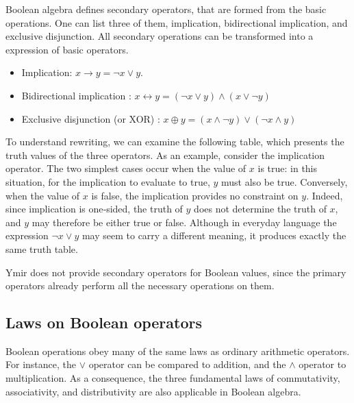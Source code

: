 Boolean algebra defines secondary operators, that are formed from the basic
operations. One can list three of them, implication, bidirectional implication,
and exclusive disjunction. All secondary operations can be transformed into a
expression of basic operators.

\begin{itemize}
\vspace{-5pt}%
\item Implication: $x \rightarrow y = \lnot x \lor y$.
\vspace{-5pt}%
\item Bidirectional implication : $x \leftrightarrow y = (\lnot x \lor y) \land (x \lor \lnot y)$ 
\vspace{-5pt}
\item Exclusive disjunction (or XOR) : $x \oplus y = (x \land \lnot y) \lor (\lnot x \land y)$
\end{itemize}
\vspace{-5pt}%




To understand rewriting, we can examine the following table, which presents the
truth values of the three operators. As an example, consider the implication
operator. The two simplest cases occur when the value of $x$ is true: in this
situation, for the implication to evaluate to true, $y$ must also be true.
Conversely, when the value of $x$ is false, the implication provides no
constraint on $y$. Indeed, since implication is one‑sided, the truth of $y$ does
not determine the truth of $x$, and $y$ may therefore be either true or false.
Although in everyday language the expression $\lnot x \lor y$ may seem to carry
a different meaning, it produces exactly the same truth table.

Ymir does not provide secondary operators for Boolean values, since the primary
operators already perform all the necessary operations on them.

\subsection{Laws on Boolean operators}

Boolean operations obey many of the same laws as ordinary arithmetic operators.
 For instance, the $\lor$ operator can be compared to addition, and the $\land$
 operator to multiplication. As a consequence, the three fundamental laws of
 commutativity, associativity, and distributivity are also applicable in Boolean
 algebra.

